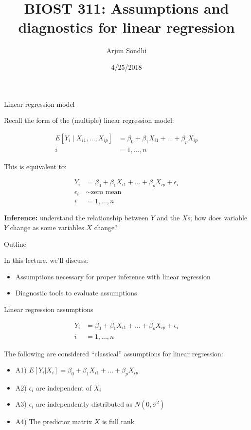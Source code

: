 \documentclass[12pt,ignorenonframetext,]{beamer}
\title{BIOST 311: Assumptions and diagnostics for linear regression}
\author{Arjun Sondhi}
\date{4/25/2018}
\providecommand{\tightlist}{%
\setlength{\itemsep}{0pt}\setlength{\parskip}{0pt}}
\begin{document}
\frame{\titlepage}

\begin{frame}{Linear regression model}

Recall the form of the (multiple) linear regression model:

\[
\begin{aligned}
E[Y_i \mid X_{i1}, \dots, X_{ip}] &= \beta_0 + \beta_1 X_{i1} + \dots + \beta_p X_{ip} \\
i &= 1, ..., n
\end{aligned}
\]

This is equivalent to:

\[
\begin{aligned}
Y_i &= \beta_0 + \beta_1 X_{i1} + \dots + \beta_p X_{ip} + \epsilon_i \\
\epsilon_i &\sim \text{zero mean} \\
i &= 1, ..., n
\end{aligned}
\]

\pause

\textbf{Inference:} understand the relationship between \(Y\) and the
\(X\)s; how does variable \(Y\) change as some variables \(X\) change?

\end{frame}

\begin{frame}{Outline}

In this lecture, we'll discuss:

\begin{itemize}
\tightlist
\item
  Assumptions necessary for proper inference with linear regression
\item
  Diagnostic tools to evaluate assumptions
\end{itemize}

\end{frame}

\begin{frame}{Linear regression assumptions}

\[
\begin{aligned}
Y_i &= \beta_0 + \beta_1 X_{i1} + \dots + \beta_p X_{ip} + \epsilon_i \\
i &= 1, ..., n
\end{aligned}
\]

The following are considered ``classical'' assumptions for linear
regression:

\begin{itemize}
\tightlist
\item
  A1)
  \(E[Y_i | X_i] = \beta_0 + \beta_1 X_{i1} + \dots + \beta_p X_{ip}\)
\item
  A2) \(\epsilon_i\) are independent of \(X_i\)
\item
  A3) \(\epsilon_i\) are independently distributed as \(N(0, \sigma^2)\)
\item
  A4) The predictor matrix \(X\) is full rank
\end{itemize}

\end{frame}
\end{document}
